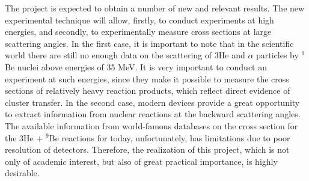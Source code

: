 \documentclass[
12pt, %
oneside, %
english, %
onehalfspacing, %
onehalfspacing, %
headsepline, %
]{MastersDoctoralThesis} %
\begin{document}
The project is expected to obtain a number of new and relevant results. The new experimental technique will allow, firstly, to conduct experiments at high energies, and secondly, to experimentally measure cross sections at large scattering angles. In the first case, it is important to note that in the scientific world there are still no enough data on the scattering of 3He and $\alpha$ particles by $^{9}$Be nuclei above energies of 35 MeV. It is very important to conduct an experiment at such energies, since they make it possible to measure the cross sections of relatively heavy reaction products, which reflect direct evidence of cluster transfer. In the second case, modern devices provide a great opportunity to extract information from nuclear reactions at the backward scattering angles. The available information from world-famous databases on the cross section for the 3He + $^{9}$Be reactions for today, unfortunately, has limitations due to poor resolution of detectors. Therefore, the realization of this project, which is not only of academic interest, but also of great practical importance, is highly desirable.

\label{Chapter1} %


\newcommand{\keyword}[1]{\textbf{#1}}
\newcommand{\tabhead}[1]{\textbf{#1}}
\newcommand{\code}[1]{\texttt{#1}}
\newcommand{\file}[1]{\texttt{\bfseries#1}}
\newcommand{\option}[1]{\texttt{\itshape#1}}

\end{document}

